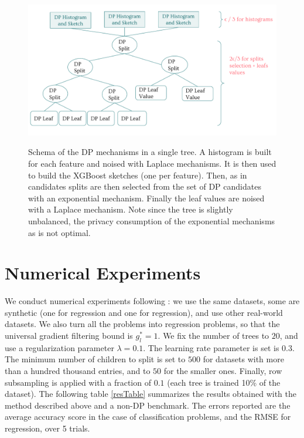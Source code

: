 \documentclass{article}
\theoremstyle{definition}
\begin{document}
\begin{figure}[h]
\centering 
\includegraphics[scale=0.7]{figs/schema_mechanisms.pdf}
\label{sketchAccuracy}
\caption{Schema of the DP mechanisms in a single tree. A histogram is built for each feature and noised with Laplace mechanisms. It is then used to build the XGBoost sketches (one per feature). Then, as in \cite{li2020privacy} candidates splits are then selected from the set of DP candidates with an exponential mechanism. Finally the leaf values are noised with a Laplace mechanism. Note since the tree is slightly unbalanced, the privacy consumption of the exponential mechanisms as is not optimal.} 
\end{figure}

\section{Numerical Experiments}

\label{numExpSection}

We conduct numerical experiments following \cite{li2020privacy}: we use the same datasets, some are synthetic (one for regression and one for regression), and use other real-world datasets. We also turn all the problems into regression problems, so that the universal gradient filtering bound is $g_l^* = 1$. We fix the number of trees to $20$, and use a regularization parameter $\lambda = 0.1$. The learning rate parameter is set is $0.3$. The minimum number of children to split is set to $500$ for datasets with more than a hundred thousand entries, and to $50$ for the smaller ones. Finally, row subsampling is applied with a fraction of $0.1$ (each tree is trained 10\% of the dataset). The following table \ref{resTable} summarizes the results obtained with the method described above and a non-DP benchmark. The errors reported are the average accuracy score in the case of classification problems, and the RMSE for regression, over 5 trials. 
\end{document}
